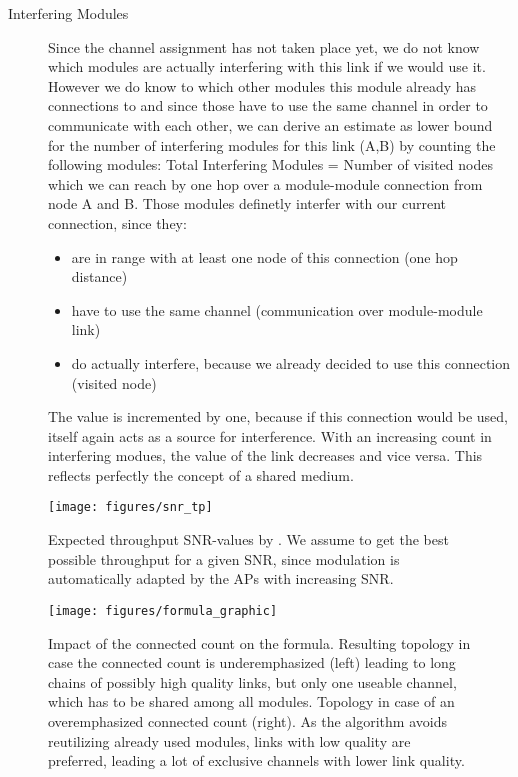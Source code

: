 \begin{description}
	  \item[Interfering Modules]
	    Since the channel assignment has not taken place yet, we do not know which modules are actually interfering with this link if we would use it.
	    However we do know to which other modules this module already has connections to and since those have to use the same channel in order to communicate with each
	    other, we can derive an estimate as lower bound for the number of interfering modules for this link (A,B) by counting the following modules:
	    Total Interfering Modules = Number of visited nodes which we can reach by one hop over a module-module connection from node A and B.
	    Those modules definetly interfer with our current connection, since they:
	    
	    \begin{itemize}
	    \item are in range with at least one node of this connection (one hop distance)
	    
	    \item have to use the same channel (communication over module-module link)
	    
	    \item do actually interfere, because we already decided to use this connection (visited node)
	    \end{itemize}

	    The value is incremented by one, because if this connection would be used, itself again acts as a source for interference.
	    With an increasing count in interfering modues, the value of the link decreases and vice versa. This reflects perfectly the concept of a shared medium.
	\end{description}
\newpage
	\begin{figure}[h!]
	  \centering
	  \texttt{[image: figures/snr\_tp]}
	  \caption{Expected throughput \ac{SNR}-values by \cite{expected_snr}. We assume to get the best possible throughput for a given SNR, since 
	    modulation is automatically adapted by the APs with increasing SNR.}
	  \label{fig:snr_tp}
	\end{figure}

	\begin{figure}[h!]
	  \centering
	  \texttt{[image: figures/formula\_graphic]}
	  \caption{Impact of the connected count on the formula. Resulting topology in case the connected count is underemphasized (left) leading
	    to long chains of possibly high quality links, but only one useable channel, which has to be shared among all modules.
	    Topology in case of an overemphasized connected count (right). As the algorithm avoids reutilizing already used modules,
	    links with low quality are preferred, leading a lot of exclusive channels with lower link quality.}
	  \label{fig:formula_graphic}
      \end{figure}
\newpage
	

